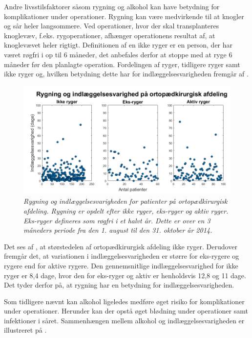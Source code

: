 Andre livsstilsfaktorer såsom rygning og alkohol kan have betydning for komplikationer under operationer. Rygning kan være medvirkende til at knogler og sår heler langsommere. Ved operationer, hvor der skal transplanteres knoglevæv, f.eks. rygoperationer, afhænger operationens resultat af, at knoglevævet heler rigtigt. Definitionen af en ikke ryger er en person, der har været røgfri i op til 6 måneder, det anbefales derfor at stoppe med at ryge 6 måneder før den planlagte operation.\cite{Nordjylland2014} Fordelingen af ryger, tidligere ryger samt ikke ryger og, hvilken betydning dette har for indlæggelsesvarigheden fremgår af .


\begin{figure}[H]
	\centering
	\includegraphics[scale=0.55]{figures/rygerogindlaeg}
	\caption{\textit{Rygning og indlæggelsesvarigheden for patienter på ortopædkirurgisk afdeling. Rygning er opdelt efter ikke ryger, eks-ryger og aktiv ryger. Eks-ryger defineres som røgfri i et halvt år. Dette er over en 3 måneders periode fra den 1. august til den 31. oktober år 2014.}}
	\label{rygningogindlaeggelse}
\end{figure}


\noindent
Det ses af , at størstedelen af ortopædkirurgisk afdeling ikke ryger. Derudover fremgår det, at variationen i indlæggelsesvarigheden er større for eks-rygere og rygere end for aktive rygere. Den gennemsnitlige indlæggelsesvarighed for ikke ryger er 8,4 dage, hvor den for eks-ryger og aktiv er henholdsvis 12,8 og 11 dage. Det tyder derfor på, at rygning har en betydning for indlæggelsesvarigheden.

Som tidligere nævnt kan alkohol ligeledes medføre øget risiko for komplikationer under operationer. Herunder kan der opstå øget blødning under operationer samt infektioner i såret.\cite{Nordjylland2014} Sammenhængen mellem alkohol og indlæggelsesvarigheden er illustreret på  . 


